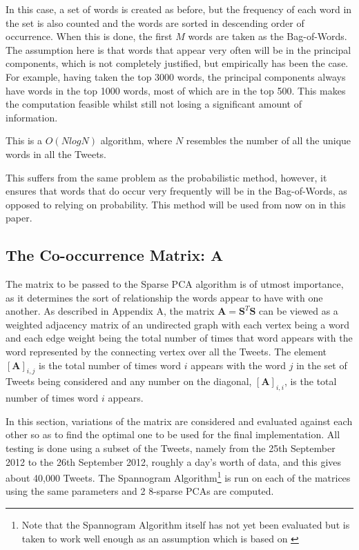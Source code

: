 \documentclass[11pt,a4paper]{article}
\newcommand{\covmat}{\mathbf{A}}
\begin{document}
In this case, a set of words is created as before, but the frequency of each word in the set is also counted and the words are sorted in descending order of occurrence. When this is done, the first $M$ words are taken as the Bag-of-Words. The assumption here is that words that appear very often will be in the principal components, which is not completely justified, but empirically has been the case. For example, having taken the top 3000 words, the principal components always have words in the top 1000 words, most of which are in the top 500. This makes the computation feasible whilst still not losing a significant amount of information.

This is a $O(NlogN)$ algorithm, where $N$ resembles the number of all the unique words in all the Tweets. 

This suffers from the same problem as the probabilistic method, however, it ensures that words that do occur very frequently will be in the Bag-of-Words, as opposed to relying on probability. This method will be used from now on in this paper.

\subsection{The Co-occurrence Matrix: $\mathbf{A}$}
\label{covmat}

The matrix to be passed to the Sparse PCA algorithm is of utmost importance, as it determines the sort of relationship the words appear to have with one another. As described in Appendix A, the matrix $\mathbf{A} = \mathbf{S}^T \mathbf{S}$ can be viewed as a weighted adjacency matrix of an undirected graph with each vertex being a word and each edge weight being the total number of times that word appears with the word represented by the connecting vertex over all the Tweets. The element $[\covmat]_{i, j}$ is the total number of times word $i$ appears with the word $j$ in the set of Tweets being considered and any number on the diagonal, $[\covmat]_{i, i}$, is the total number of times word $i$ appears. 

In this section, variations of the matrix are considered and evaluated against each other so as to find the optimal one to be used for the final implementation. All testing is done using a subset of the Tweets, namely from the 25th September 2012 to the 26th September 2012, roughly a day's worth of data, and this gives about 40,000 Tweets. The Spannogram Algorithm\footnote{Note that the Spannogram Algorithm itself has not yet been evaluated but is taken to work well enough as an assumption which is based on \cite{dimakis}} is run on each of the matrices using the same parameters and 2 8-sparse PCAs are computed.
\end{document}
